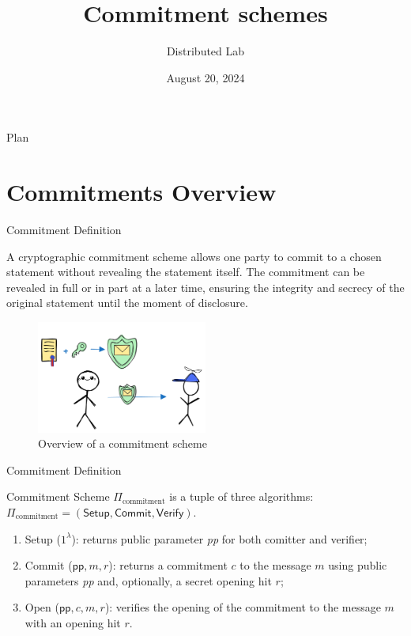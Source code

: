 \documentclass[xcolor={usenames,dvipsnames}]{beamer}
\title[Commitment schemes]{\textbf{Commitment schemes}}
\author{Distributed Lab}
\date{August 20, 2024}
\begin{document}
	\frame {
		\titlepage
	}
 
	\begin{frame}{Plan}
        \tableofcontents
    \end{frame}

	\section{Commitments Overview}

    \begin{frame}{Commitment Definition}
        \begin{definition}
            A cryptographic commitment scheme allows one party to commit to a chosen statement without revealing the statement itself. 
            The commitment can be revealed in full or in part at a later time, ensuring the integrity and secrecy of the original statement until 
            the moment of disclosure.
        \end{definition}

        \begin{figure}
            \centering
            \includegraphics[width=0.5\textwidth]{images/lecture_5/CommitmentExample.png}
            \caption{Overview of a commitment scheme}
        \end{figure}
    \end{frame}

    \begin{frame}{Commitment Definition}
        \begin{definition}
            Commitment Scheme $\Pi_{\text{commitment}}$ is a tuple of three algorithms: $\Pi_{\text{commitment}} = (\mathsf{Setup}, \mathsf{Commit}, \mathsf{Verify})$.

            \begin{enumerate}

                \item Setup ($1^{\lambda}$): returns public parameter \textit{pp} for both comitter and verifier;

                \item  Commit ($\mathsf{pp}, m, r$): returns a commitment $c$ to the message $m$ using public parameters \textit{pp} and, optionally, a secret opening hit $r$;

                \item  Open ($\mathsf{pp}, c, m, r$): verifies the opening of the commitment to the message $m$ with an opening hit $r$. 
            \end{enumerate}
        \end{definition}

    \end{frame}
\end{document}
